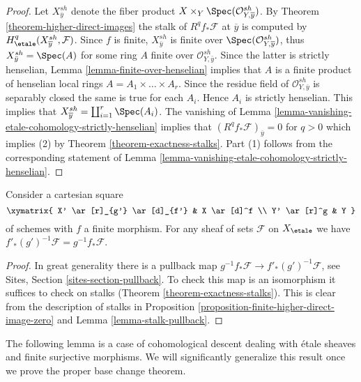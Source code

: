 \begin{proof}
Let $X_{\overline{y}}^{sh}$ denote the fiber product
$X \times_Y \Spec(\mathcal{O}_{Y, \overline{y}}^{sh})$.
By Theorem \ref{theorem-higher-direct-images}
the stalk of $R^qf_*\mathcal{F}$ at $\overline{y}$ is computed by
$H_\etale^q(X_{\overline{y}}^{sh}, \mathcal{F})$.
Since $f$ is finite, $X_{\bar y}^{sh}$ is finite over
$\Spec(\mathcal{O}_{Y, \overline{y}}^{sh})$, thus
$X_{\bar y}^{sh} = \Spec(A)$ for some ring $A$
finite over $\mathcal{O}_{Y, \bar y}^{sh}$.
Since the latter is strictly henselian,
Lemma \ref{lemma-finite-over-henselian}
implies that $A$ is a finite product of henselian local rings
$A = A_1 \times \ldots \times A_r$. Since the residue field of
$\mathcal{O}_{Y, \overline{y}}^{sh}$ is separably closed the
same is true for each $A_i$. Hence $A_i$ is strictly henselian.
This implies that $X_{\overline{y}}^{sh} = \coprod_{i = 1}^r \Spec(A_i)$.
The vanishing of
Lemma \ref{lemma-vanishing-etale-cohomology-strictly-henselian}
implies that $(R^qf_*\mathcal{F})_{\overline{y}} = 0$ for $q > 0$
which implies (2) by Theorem \ref{theorem-exactness-stalks}.
Part (1) follows from the corresponding statement of
Lemma \ref{lemma-vanishing-etale-cohomology-strictly-henselian}.
\end{proof}

\begin{lemma}
\label{lemma-finite-pushforward-commutes-with-base-change}
Consider a cartesian square
$$
\xymatrix{
X' \ar[r]_{g'} \ar[d]_{f'} & X \ar[d]^f \\
Y' \ar[r]^g & Y
}
$$
of schemes with $f$ a finite morphism. For any sheaf of sets
$\mathcal{F}$ on $X_\etale$ we have
$f'_*(g')^{-1}\mathcal{F} = g^{-1}f_*\mathcal{F}$.
\end{lemma}

\begin{proof}
In great generality there is a pullback map
$g^{-1}f_*\mathcal{F} \to f'_*(g')^{-1}\mathcal{F}$, see
Sites, Section \ref{sites-section-pullback}.
To check this map is an isomorphism it suffices to check
on stalks (Theorem \ref{theorem-exactness-stalks}).
This is clear from the description of stalks
in Proposition \ref{proposition-finite-higher-direct-image-zero} and
Lemma \ref{lemma-stalk-pullback}.
\end{proof}

\noindent
The following lemma is a case of cohomological descent dealing with
\'etale sheaves and finite surjective morphisms. We will significantly
generalize this result once we prove the proper base change theorem.

